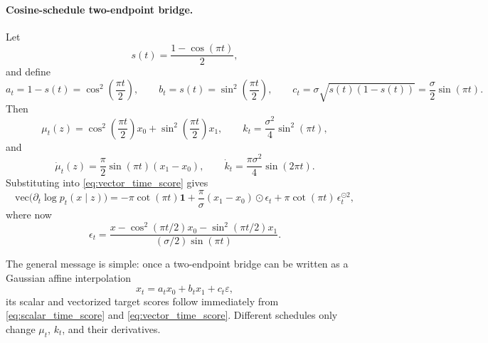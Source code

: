 \paragraph{Cosine-schedule two-endpoint bridge.}
Let
\begin{equation}
s(t)=\frac{1-\cos(\pi t)}{2},
\end{equation}
and define
\begin{equation}
a_t = 1-s(t)=\cos^2\!\left(\frac{\pi t}{2}\right),
\qquad
b_t = s(t)=\sin^2\!\left(\frac{\pi t}{2}\right),
\qquad
c_t = \sigma \sqrt{s(t)(1-s(t))}=\frac{\sigma}{2}\sin(\pi t).
\end{equation}
Then
\begin{equation}
\mu_t(z)=\cos^2\!\left(\frac{\pi t}{2}\right)x_0+\sin^2\!\left(\frac{\pi t}{2}\right)x_1,
\qquad
k_t=\frac{\sigma^2}{4}\sin^2(\pi t),
\end{equation}
and
\begin{equation}
\dot \mu_t(z)=\frac{\pi}{2}\sin(\pi t)(x_1-x_0),
\qquad
\dot k_t=\frac{\pi \sigma^2}{4}\sin(2\pi t).
\end{equation}
Substituting into \eqref{eq:vector_time_score} gives
\begin{equation}
\mathrm{vec}\!\bigl(\partial_t \log p_t(x \mid z)\bigr)
=
-\pi \cot(\pi t)\mathbf 1
+
\frac{\pi}{\sigma}(x_1-x_0)\odot \epsilon_t
+
\pi \cot(\pi t)\,\epsilon_t^{\odot 2},
\end{equation}
where now
\begin{equation}
\epsilon_t
=
\frac{x-\cos^2(\pi t/2)x_0-\sin^2(\pi t/2)x_1}{(\sigma/2)\sin(\pi t)}.
\end{equation}

The general message is simple: once a two-endpoint bridge can be written as a Gaussian affine interpolation
\begin{equation}
x_t = a_t x_0 + b_t x_1 + c_t \varepsilon,
\end{equation}
its scalar and vectorized target scores follow immediately from \eqref{eq:scalar_time_score} and \eqref{eq:vector_time_score}. Different schedules only change $\mu_t$, $k_t$, and their derivatives.
